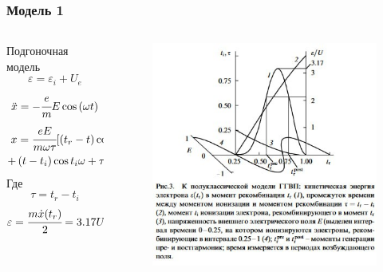 \documentclass[handout]{beamer}
\newcommand{\inner}[1]{\left( #1 \right)}
\newcommand{\eps}{\varepsilon}
\begin{document}
\begin{frame}
    \frametitle{Модель 1}
    \begin{columns}
        \begin{column}{0.5\textwidth}
            Подгоночная модель
            \begin{equation}
                \eps = \eps_i + U_e
            \end{equation}
            \begin{equation*}
                \ddot x = - \cfrac{e}{m}E \cos\inner{\omega t}
            \end{equation*}
            \begin{align*}
                x = \cfrac{eE}{m\omega \tau } [\inner{t_r - t} \cos t_r \omega + \\
                + \inner{t - t_i} \cos t_i \omega + \tau \cos t \omega]
            \end{align*}
            Где
            \begin{equation*}
                \tau = t_r - t_i
            \end{equation*}    
            \begin{equation}
                \eps = \cfrac{m \dot x (t_r)}{2} = 3.17 U
            \end{equation}
        \end{column}
        
        \begin{column}{0.5\textwidth}
            \begin{figure}[h]
                \centering
                \includegraphics[width=1\textwidth]{new/approx.jpg}
            \end{figure}
        \end{column}
      \end{columns}
\end{frame}
\end{document}

